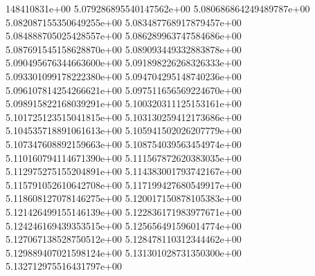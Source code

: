148410831e+00	5.079286895540147562e+00	5.080686864249489787e+00	5.082087155350649255e+00	5.083487768917879457e+00	5.084888705025428557e+00	5.086289963747584686e+00	5.087691545158628870e+00	5.089093449332883878e+00	5.090495676344663600e+00	5.091898226268326333e+00	5.093301099178222380e+00	5.094704295148740236e+00	5.096107814254266621e+00	5.097511656569224670e+00	5.098915822168039291e+00	5.100320311125153161e+00	5.101725123515041815e+00	5.103130259412173686e+00	5.104535718891061613e+00	5.105941502026207779e+00	5.107347608892159663e+00	5.108754039563454974e+00	5.110160794114671390e+00	5.111567872620383035e+00	5.112975275155204891e+00	5.114383001793742167e+00	5.115791052610642708e+00	5.117199427680549917e+00	5.118608127078146275e+00	5.120017150878105383e+00	5.121426499155146139e+00	5.122836171983977671e+00	5.124246169439353515e+00	5.125656491596014774e+00	5.127067138528750512e+00	5.128478110312344462e+00	5.129889407021598124e+00	5.131301028731350300e+00	5.132712975516431797e+00
